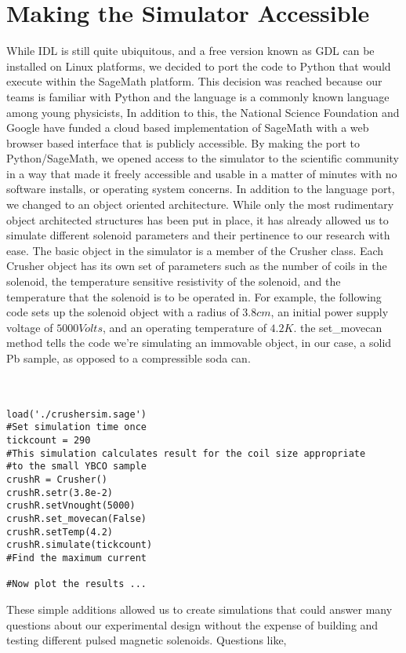 \documentclass[prb,preprint]{revtex4-1}
\begin{document}
\section{Making the Simulator Accessible}
While IDL is still quite ubiquitous, and a free version known as GDL can be installed on Linux platforms, we decided to port the code to Python that would execute within the SageMath platform.  This decision was reached because our teams is familiar with Python and the language is a commonly known language among young physicists, In addition to this, the National Science Foundation and Google have funded a cloud based implementation of SageMath with a web browser based interface that is publicly accessible.  By making the port to Python/SageMath, we opened access to the simulator to the scientific community in a way that made it freely accessible and usable in a matter of minutes with no software installs, or operating system concerns.
In addition to the language port, we changed to an object oriented architecture.  While only the most rudimentary object architected structures has been put in place, it has already allowed us to simulate different solenoid parameters and their pertinence to our research with ease.  The basic object in the simulator is a member of the Crusher class.  Each Crusher object has its own set of parameters such as the number of coils in the solenoid, the temperature sensitive resistivity of the solenoid, and the temperature that the solenoid is to be operated in.  For example, the following code sets up the solenoid object with a radius of $3.8 cm$, an initial power supply voltage of $5000 Volts$, and an operating temperature of $4.2 K$.  the set\_movecan method tells the code we're simulating an immovable object, in our case, a solid Pb sample, as opposed to a compressible soda can.
\\\\\\
\lstset{language=Python}
\begin{lstlisting}[frame=single]
load('./crushersim.sage')
#Set simulation time once
tickcount = 290
#This simulation calculates result for the coil size appropriate
#to the small YBCO sample
crushR = Crusher()
crushR.setr(3.8e-2)
crushR.setVnought(5000)
crushR.set_movecan(False)
crushR.setTemp(4.2)
crushR.simulate(tickcount)
#Find the maximum current

#Now plot the results ...
\end{lstlisting}
These simple additions allowed us to create simulations that could answer many questions about our experimental design without the expense of building and testing different pulsed magnetic solenoids.  Questions like, 
\end{document}
